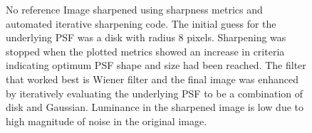 \begin{figure}[H]
\begin{subfigure}[b]{0.49\textwidth}
        \end{subfigure}
              
        \caption{ No reference Image sharpened using sharpness metrics and automated iterative sharpening code. The initial guess for the underlying PSF was a disk with radius 8 pixels. Sharpening was stopped when the plotted metrics showed an increase in criteria indicating optimum PSF shape and size had been reached. The filter that worked best is Wiener filter and the final image was enhanced by iteratively evaluating the underlying PSF to be a combination of disk and Gaussian. Luminance in the sharpened image is low due to high magnitude of noise in the original image.} \label{fig:true_metrics}
\end{figure}

\newpage